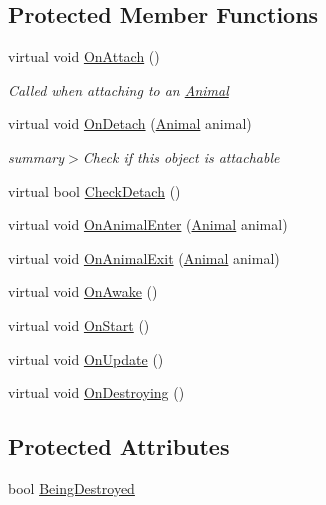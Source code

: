 \subsection*{Protected Member Functions}
\begin{DoxyCompactItemize}
\item 
virtual void \mbox{\hyperlink{class_attachable_a813281e423def538cd834f0db80c9ec8}{On\+Attach}} ()
\begin{DoxyCompactList}\small\item\em Called when attaching to an \mbox{\hyperlink{class_animal}{Animal}}\end{DoxyCompactList}\item 
virtual void \mbox{\hyperlink{class_attachable_abe7cf9d7930393610c7c9c4ae14b12d7}{On\+Detach}} (\mbox{\hyperlink{class_animal}{Animal}} animal)
\begin{DoxyCompactList}\small\item\em summary$>$Check if this object is attachable\end{DoxyCompactList}\item 
virtual bool \mbox{\hyperlink{class_attachable_a5cd6ea1bf16c527c033e6f09681f84f8}{Check\+Detach}} ()
\item 
virtual void \mbox{\hyperlink{class_attachable_a068e297fb6be04b5162db5ce61290020}{On\+Animal\+Enter}} (\mbox{\hyperlink{class_animal}{Animal}} animal)
\item 
virtual void \mbox{\hyperlink{class_attachable_a6de7e01430734a291be84f3065b45537}{On\+Animal\+Exit}} (\mbox{\hyperlink{class_animal}{Animal}} animal)
\item 
virtual void \mbox{\hyperlink{class_attachable_a10b95ee6da8ee9cb6b0fe1085abd7205}{On\+Awake}} ()
\item 
virtual void \mbox{\hyperlink{class_attachable_a3c05c0b07b831881a7ab245057d34d30}{On\+Start}} ()
\item 
virtual void \mbox{\hyperlink{class_attachable_abb659a66efacd6fa09fa1d7125c7b5e6}{On\+Update}} ()
\item 
virtual void \mbox{\hyperlink{class_attachable_a948016df773dff01ee30da2c903e5495}{On\+Destroying}} ()
\end{DoxyCompactItemize}
\subsection*{Protected Attributes}
\begin{DoxyCompactItemize}
\item 
bool \mbox{\hyperlink{class_attachable_a0a30ee7e7b2c59e52732ee993b0e5089}{Being\+Destroyed}}
\end{DoxyCompactItemize}
